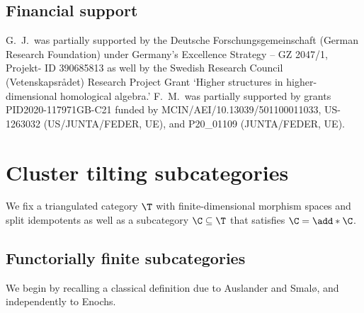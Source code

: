 \documentclass[a4paper]{amsart}
\begin{document}
\subsection*{Financial support}

G.~J.~was partially supported by the Deutsche Forschungsgemeinschaft (German
Research Foundation) under Germany's Excellence Strategy – GZ 2047/1, Projekt-
ID 390685813 as well by the Swedish Research Council (Vetenskapsrådet) Research Project
Grant `Higher structures in higher-dimensional homological algebra.' F.~M.~was partially supported by grants PID2020-117971GB-C21
funded by MCIN/AEI/10.13039/501100011033, US-1263032 (US/JUNTA/FEDER, UE), and
P20\_01109 (JUNTA/FEDER, UE).

\section{Cluster tilting subcategories}
\label{sec:CT}

\begin{setting}
  \label{setting:ct_angulated}
  We fix a triangulated category $\T$ with finite-dimensional morphism spaces
  and split idempotents as well as a subcategory $\C\subseteq\T$ that satisfies
  ${\C=\add*{\C}}$.
\end{setting}

\subsection{Functorially finite subcategories}

We begin by recalling a classical definition due to Auslander and Smal{\o}, and
independently to Enochs.
\end{document}
